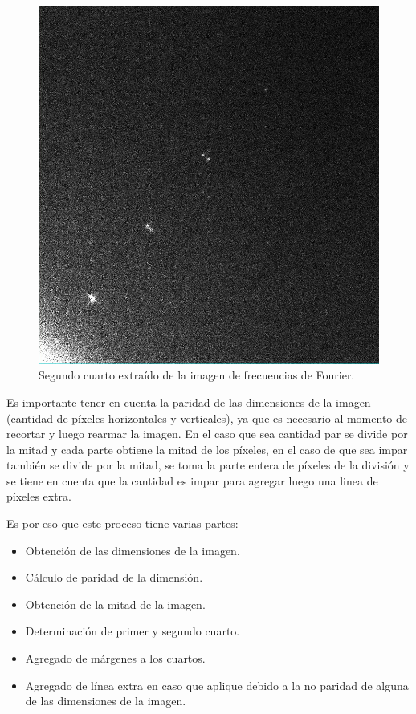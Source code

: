 \documentclass[10pt,a4paper, twoside]{report}
\begin{document}
\begin{figure}[!htb]
\begin {minipage}{0.48\textwidth}
			\includegraphics[width=1.0\linewidth]{imagenes/sndQuarterFourier.jpg}
			\caption{Segundo cuarto extraído de la imagen de frecuencias de Fourier.}
			\label{secondQuarter}
   \end{minipage}
\end{figure}

Es importante tener en cuenta la paridad de las dimensiones de la imagen (cantidad de píxeles horizontales y verticales), ya que es necesario al momento de recortar y luego rearmar la imagen. En el caso que sea cantidad par se divide por la mitad y cada parte obtiene la mitad de los píxeles, en el caso de que sea impar también se divide por la mitad, se toma la parte entera de píxeles de la división y se tiene en cuenta que la cantidad es impar para agregar luego una linea de píxeles extra.

Es por eso que este proceso tiene varias partes:

\begin{itemize}
	\item Obtención de las dimensiones de la imagen.
	\item Cálculo de paridad de la dimensión.
	\item Obtención de la mitad de la imagen.
	\item Determinación de primer y segundo cuarto.
	\item Agregado de márgenes a los cuartos.
	\item Agregado de línea extra en caso que aplique debido a la no paridad de alguna de las dimensiones de la imagen.
\end{itemize}
\end{document}
